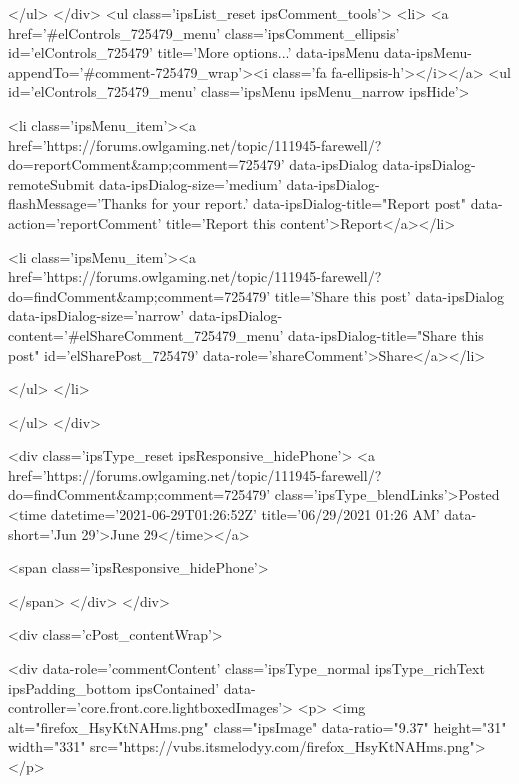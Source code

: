 					
					
					
					
				</ul>
			</div>
			<ul class='ipsList_reset ipsComment_tools'>
				<li>
					<a href='#elControls_725479_menu' class='ipsComment_ellipsis' id='elControls_725479' title='More options...' data-ipsMenu data-ipsMenu-appendTo='#comment-725479_wrap'><i class='fa fa-ellipsis-h'></i></a>
					<ul id='elControls_725479_menu' class='ipsMenu ipsMenu_narrow ipsHide'>
						
							<li class='ipsMenu_item'><a href='https://forums.owlgaming.net/topic/111945-farewell/?do=reportComment&amp;comment=725479' data-ipsDialog data-ipsDialog-remoteSubmit data-ipsDialog-size='medium' data-ipsDialog-flashMessage='Thanks for your report.' data-ipsDialog-title="Report post" data-action='reportComment' title='Report this content'>Report</a></li>
						
						
							<li class='ipsMenu_item'><a href='https://forums.owlgaming.net/topic/111945-farewell/?do=findComment&amp;comment=725479' title='Share this post' data-ipsDialog data-ipsDialog-size='narrow' data-ipsDialog-content='#elShareComment_725479_menu' data-ipsDialog-title="Share this post" id='elSharePost_725479' data-role='shareComment'>Share</a></li>
						
                        
						
						
						
							
								
							
							
							
							
							
							
						
					</ul>
				</li>
				
			</ul>
		</div>

		<div class='ipsType_reset ipsResponsive_hidePhone'>
			<a href='https://forums.owlgaming.net/topic/111945-farewell/?do=findComment&amp;comment=725479' class='ipsType_blendLinks'>Posted <time datetime='2021-06-29T01:26:52Z' title='06/29/2021 01:26  AM' data-short='Jun 29'>June 29</time></a> 
			
			<span class='ipsResponsive_hidePhone'>
				
				
			</span>
		</div>
	</div>

	

    

	<div class='cPost_contentWrap'>
		
		<div data-role='commentContent' class='ipsType_normal ipsType_richText ipsPadding_bottom ipsContained' data-controller='core.front.core.lightboxedImages'>
			<p>
	<img alt="firefox_HsyKtNAHms.png" class="ipsImage" data-ratio="9.37" height="31" width="331" src="https://vubs.itsmelodyy.com/firefox_HsyKtNAHms.png"></p>

